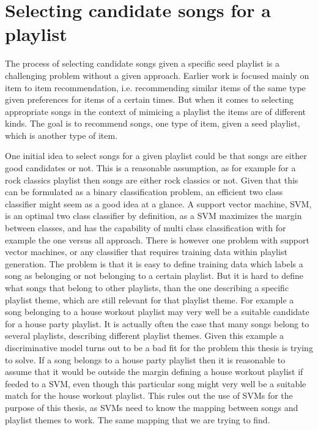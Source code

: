 \documentclass[a4paper,11pt]{kth-mag}
\begin{document}
\section{Selecting candidate songs for a playlist}
The process of selecting candidate songs given a specific seed playlist is a challenging problem without a given approach. Earlier work is focused mainly on item to item recommendation, i.e. recommending similar items of the same type given preferences for items of a certain times. But when it comes to selecting appropriate songs in the context of mimicing a playlist the items are of different kinds. The goal is to recommend songs, one type of item, given a seed playlist, which is another type of item. 

One initial idea to select songs for a given playlist could be that songs are either good candidates or not. This is a reasonable assumption, as for example for a rock classics playlist then songs are either rock classics or not. Given that this can be formulated as a binary classification problem, an efficient two class classifier might seem as a good idea at a glance. A support vector machine, SVM,  is an optimal two class classifier by definition, as a SVM maximizes the margin between classes\cite{cortes1995support}, and has the capability of multi class classification with for example the one versus all approach\cite{hsu2002comparison}. There is however one problem with support vector machines, or any classifier that requires training data within playlist generation. The problem is that it is easy to define training data which labels a song as belonging or not belonging to a certain playlist. But it is hard to define what songs that belong to other playlists, than the one describing a specific playlist theme, which are still relevant for that playlist theme. For example a song belonging to a house workout playlist may very well be a suitable candidate for a house party playlist. It is actually often the case that many songs belong to several playlists, describing different playlist themes. Given this example a discriminative model turns out to be a bad fit for the problem this thesis is trying to solve. If a song belongs to a house party playlist then it is reasonable to assume that it would be outside the margin defining a house workout playlist if feeded to a SVM, even though this particular song might very well be a suitable match for the house workout playlist. This rules out the use of SVMs for the purpose of this thesis, as SVMs need to know the mapping between songs and playlist themes to work. The same mapping that we are trying to find.
\end{document}
